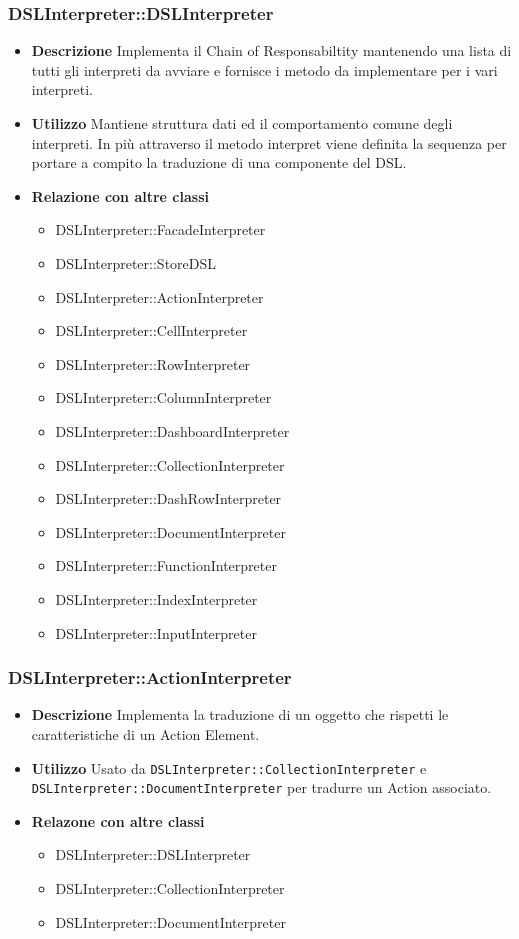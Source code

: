 \subsubsection{DSLInterpreter::DSLInterpreter}
\begin{itemize}
\item \textbf{Descrizione}
  Implementa il Chain of Responsabiltity mantenendo una lista di tutti gli interpreti da avviare e fornisce i metodo da implementare per i vari interpreti.
\item \textbf{Utilizzo}
  Mantiene struttura dati ed il comportamento comune degli interpreti. In più attraverso il metodo interpret viene definita la sequenza per portare a compito la traduzione di una componente del DSL.
\item \textbf{Relazione con altre classi} \hfill
  \begin{itemize}
  \item DSLInterpreter::FacadeInterpreter
  \item DSLInterpreter::StoreDSL
  \item DSLInterpreter::ActionInterpreter
  \item DSLInterpreter::CellInterpreter
  \item DSLInterpreter::RowInterpreter
  \item DSLInterpreter::ColumnInterpreter
  \item DSLInterpreter::DashboardInterpreter
  \item DSLInterpreter::CollectionInterpreter
  \item DSLInterpreter::DashRowInterpreter
  \item DSLInterpreter::DocumentInterpreter
  \item DSLInterpreter::FunctionInterpreter
  \item DSLInterpreter::IndexInterpreter
  \item DSLInterpreter::InputInterpreter
  \end{itemize}
\end{itemize}

\subsubsection{DSLInterpreter::ActionInterpreter}
\begin{itemize}
\item \textbf{Descrizione}
Implementa la traduzione di un oggetto che rispetti le caratteristiche di un Action Element.
\item \textbf{Utilizzo}
Usato da \texttt{DSLInterpreter::CollectionInterpreter} e \texttt{DSLInterpreter::DocumentInterpreter} per tradurre un Action associato.
\item \textbf{Relazone con altre classi}
\begin{itemize}
\item DSLInterpreter::DSLInterpreter
\item DSLInterpreter::CollectionInterpreter
\item DSLInterpreter::DocumentInterpreter
\end{itemize}
\end{itemize}

